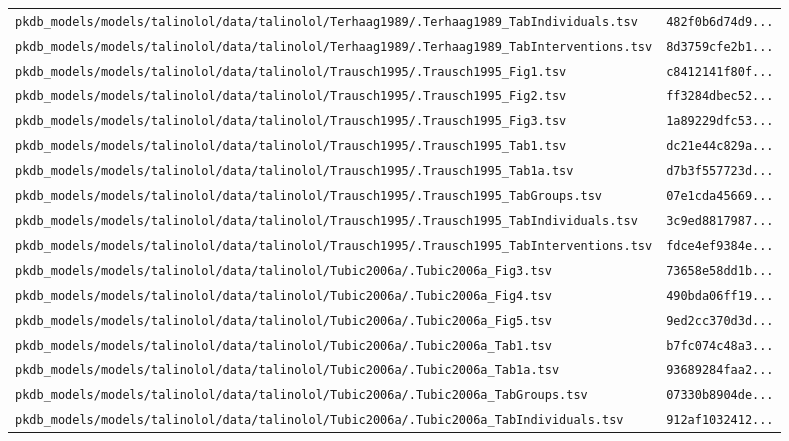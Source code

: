 \begin{longtable}{ll}
\texttt{pkdb\_models/models/talinolol/data/talinolol/Terhaag1989/.Terhaag1989\_TabIndividuals.tsv} & \texttt{482f0b6d74d9...} \\
\texttt{pkdb\_models/models/talinolol/data/talinolol/Terhaag1989/.Terhaag1989\_TabInterventions.tsv} & \texttt{8d3759cfe2b1...} \\
\texttt{pkdb\_models/models/talinolol/data/talinolol/Trausch1995/.Trausch1995\_Fig1.tsv} & \texttt{c8412141f80f...} \\
\texttt{pkdb\_models/models/talinolol/data/talinolol/Trausch1995/.Trausch1995\_Fig2.tsv} & \texttt{ff3284dbec52...} \\
\texttt{pkdb\_models/models/talinolol/data/talinolol/Trausch1995/.Trausch1995\_Fig3.tsv} & \texttt{1a89229dfc53...} \\
\texttt{pkdb\_models/models/talinolol/data/talinolol/Trausch1995/.Trausch1995\_Tab1.tsv} & \texttt{dc21e44c829a...} \\
\texttt{pkdb\_models/models/talinolol/data/talinolol/Trausch1995/.Trausch1995\_Tab1a.tsv} & \texttt{d7b3f557723d...} \\
\texttt{pkdb\_models/models/talinolol/data/talinolol/Trausch1995/.Trausch1995\_TabGroups.tsv} & \texttt{07e1cda45669...} \\
\texttt{pkdb\_models/models/talinolol/data/talinolol/Trausch1995/.Trausch1995\_TabIndividuals.tsv} & \texttt{3c9ed8817987...} \\
\texttt{pkdb\_models/models/talinolol/data/talinolol/Trausch1995/.Trausch1995\_TabInterventions.tsv} & \texttt{fdce4ef9384e...} \\
\texttt{pkdb\_models/models/talinolol/data/talinolol/Tubic2006a/.Tubic2006a\_Fig3.tsv} & \texttt{73658e58dd1b...} \\
\texttt{pkdb\_models/models/talinolol/data/talinolol/Tubic2006a/.Tubic2006a\_Fig4.tsv} & \texttt{490bda06ff19...} \\
\texttt{pkdb\_models/models/talinolol/data/talinolol/Tubic2006a/.Tubic2006a\_Fig5.tsv} & \texttt{9ed2cc370d3d...} \\
\texttt{pkdb\_models/models/talinolol/data/talinolol/Tubic2006a/.Tubic2006a\_Tab1.tsv} & \texttt{b7fc074c48a3...} \\
\texttt{pkdb\_models/models/talinolol/data/talinolol/Tubic2006a/.Tubic2006a\_Tab1a.tsv} & \texttt{93689284faa2...} \\
\texttt{pkdb\_models/models/talinolol/data/talinolol/Tubic2006a/.Tubic2006a\_TabGroups.tsv} & \texttt{07330b8904de...} \\
\texttt{pkdb\_models/models/talinolol/data/talinolol/Tubic2006a/.Tubic2006a\_TabIndividuals.tsv} & \texttt{912af1032412...} \\

\end{longtable}
